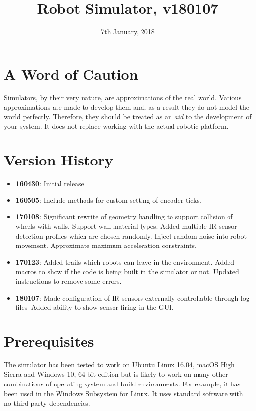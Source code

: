 \documentclass[a4paper]{article}
\begin{document}
\title{\Huge\bfseries Robot Simulator, v180107}
\date{7th January, 2018}

\maketitle

\tableofcontents

\section{A Word of Caution}

Simulators, by their very nature, are approximations of the real
world. Various approximations are made to develop them and, as a
result they do not model the world perfectly. Therefore, they should
be treated as an {\itshape aid\/} to the development of your
system. It does not replace working with the actual robotic platform.

\section{Version History}

\begin{itemize}
\item {\bfseries 160430}: Initial release
\item {\bfseries 160505}: Include methods for custom setting of
  encoder ticks.
\item {\bfseries 170108}: Significant rewrite of geometry handling to
  support collision of wheels with walls. Support wall material
  types. Added multiple IR sensor detection profiles which are chosen
  randomly. Inject random noise into robot movement. Approximate
  maximum acceleration constraints.
\item {\bfseries 170123}: Added trails which robots can leave in the
  environment. Added macros to show if the code is being built in the
  simulator or not. Updated instructions to remove some errors.
 \item {\bfseries 180107}: Made configuration of IR sensors externally
 controllable through log files. Added ability to show sensor firing in the GUI.
\end{itemize}

\section{Prerequisites}

The simulator has been tested to work on Ubuntu Linux 16.04, macOS High Sierra
and Windows 10, 64-bit edition but is likely to work on many other combinations
of operating system and build environments. For example, it has been used in the
Windows Subsystem for Linux. It uses standard software with no third party
dependencies.
\end{document}
